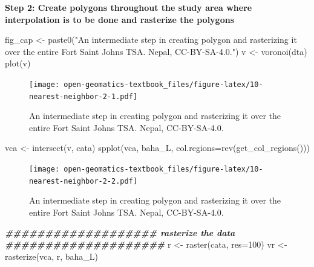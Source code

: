 \documentclass[
]{book}
\newenvironment{Shaded}{\begin{snugshade}}{\end{snugshade}}
\newcommand{\AttributeTok}[1]{\textcolor[rgb]{0.77,0.63,0.00}{#1}}
\newcommand{\DecValTok}[1]{\textcolor[rgb]{0.00,0.00,0.81}{#1}}
\newcommand{\DocumentationTok}[1]{\textcolor[rgb]{0.56,0.35,0.01}{\textbf{\textit{#1}}}}
\newcommand{\FunctionTok}[1]{\textcolor[rgb]{0.00,0.00,0.00}{#1}}
\newcommand{\NormalTok}[1]{#1}
\newcommand{\OtherTok}[1]{\textcolor[rgb]{0.56,0.35,0.01}{#1}}
\newcommand{\StringTok}[1]{\textcolor[rgb]{0.31,0.60,0.02}{#1}}
\begin{document}
\textbf{Step 2: Create polygons throughout the study area where interpolation is to be done and rasterize the polygons}

\begin{Shaded}
\begin{Highlighting}[]
\NormalTok{fig\_cap }\OtherTok{\textless{}{-}} \FunctionTok{paste0}\NormalTok{(}\StringTok{"An intermediate step in creating polygon and rasterizing it over the entire Fort Saint Johns TSA. Nepal, CC{-}BY{-}SA{-}4.0."}\NormalTok{)}
\NormalTok{v }\OtherTok{\textless{}{-}} \FunctionTok{voronoi}\NormalTok{(dta)}
\FunctionTok{plot}\NormalTok{(v)}
\end{Highlighting}
\end{Shaded}

\begin{figure}
\centering
\texttt{[image: open-geomatics-textbook\_files/figure-latex/10-nearest-neighbor-2-1.pdf]}
\caption{\label{fig:10-nearest-neighbor-2-1}An intermediate step in creating polygon and rasterizing it over the entire Fort Saint Johns TSA. Nepal, CC-BY-SA-4.0.}
\end{figure}

\begin{Shaded}
\begin{Highlighting}[]
\NormalTok{vca }\OtherTok{\textless{}{-}} \FunctionTok{intersect}\NormalTok{(v, cata)}
\FunctionTok{spplot}\NormalTok{(vca, }\StringTok{\textquotesingle{}baha\_L\textquotesingle{}}\NormalTok{, }\AttributeTok{col.regions=}\FunctionTok{rev}\NormalTok{(}\FunctionTok{get\_col\_regions}\NormalTok{()))}
\end{Highlighting}
\end{Shaded}

\begin{figure}
\centering
\texttt{[image: open-geomatics-textbook\_files/figure-latex/10-nearest-neighbor-2-2.pdf]}
\caption{\label{fig:10-nearest-neighbor-2-2}An intermediate step in creating polygon and rasterizing it over the entire Fort Saint Johns TSA. Nepal, CC-BY-SA-4.0.}
\end{figure}

\begin{Shaded}
\begin{Highlighting}[]
\DocumentationTok{\#\#\#\#\#\#\#\#\#\#\#\#\#\#\#\#\#\#\# rasterize the data \#\#\#\#\#\#\#\#\#\#\#\#\#\#\#\#\#\#\#\#}
\NormalTok{r }\OtherTok{\textless{}{-}} \FunctionTok{raster}\NormalTok{(cata, }\AttributeTok{res=}\DecValTok{100}\NormalTok{)}
\NormalTok{vr }\OtherTok{\textless{}{-}} \FunctionTok{rasterize}\NormalTok{(vca, r, }\StringTok{\textquotesingle{}baha\_L\textquotesingle{}}\NormalTok{)}
\end{Highlighting}
\end{Shaded}
\end{document}
